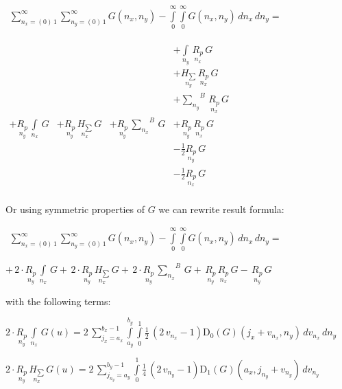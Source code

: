 \documentclass[11pt]{article}
\begin{document}
    \(\begin{array}{r} \sum\limits_{n_x=\left(0\right)\,1}^{\infty} \sum\limits_{n_y=\left(0\right)\,1}^{\infty} G\left(n_x, n_y\right) - \int\limits_{0}^{\infty} \int\limits_{0}^{\infty} G\left(n_x, n_y\right)\,d{n_x}\,d{n_y} = \end{array}\)

    \(\begin{array}{llll}  \,&  \,&  \,&  + \int\limits_{n_y}^{}\,\underset{n_x}{R_{p}}\,G \\  \,&  \,&  \,&  + \underset{n_y}{H_{\sum}}\,\underset{n_x}{R_{p}}\,G \\  \,&  \,&  \,&  + {\sum\limits_{n_y}^{}}^{B}\,\underset{n_x}{R_{p}}\,G \\  + \underset{n_y}{R_{p}}\,\int\limits_{n_x}^{}\,G &  + \underset{n_y}{R_{p}}\,\underset{n_x}{H_{\sum}}\,G &  + \underset{n_y}{R_{p}}\,{\sum\limits_{n_x}^{}}^{B}\,G &  + \underset{n_y}{R_{p}}\,\underset{n_x}{R_{p}}\,G \\  \,&  \,&  \,&  - \frac{1}{2}\underset{n_y}{R_{p}}\,G \\  \,&  \,&  \,&  - \frac{1}{2}\underset{n_x}{R_{p}}\,G \\ \end{array}\)

    Or using symmetric properties of \(G\) we can rewrite result formula:

    \(\begin{array}{r} \sum\limits_{n_x=\left(0\right)\,1}^{\infty} \sum\limits_{n_y=\left(0\right)\,1}^{\infty} G\left(n_x, n_y\right) - \int\limits_{0}^{\infty} \int\limits_{0}^{\infty} G\left(n_x, n_y\right)\,d{n_x}\,d{n_y} = \end{array}\)

    \(+\,2\cdot\underset{n_y}{R_{p}}\,\int\limits_{n_x}^{}\,G +\,2\cdot\underset{n_y}{R_{p}}\,\underset{n_x}{H_{\sum}}\,G +\,2\cdot\underset{n_y}{R_{p}}\,{\sum\limits_{n_x}^{}}^{B}\,G +\,\underset{n_y}{R_{p}}\,\underset{n_x}{R_{p}}\,G -\,\underset{n_y}{R_{p}}\,G\)

    with the following terms:

\(2\cdot\underset{n_y}{R_{p}}\,\int\limits_{n_x}^{}\,G\left(u\right) = 2 \, {\sum\limits_{j_{x}=a_{x}}^{b_{x} - 1} \int\limits_{a_{y}}^{b_{y}} \int\limits_{0}^{1} \frac{1}{2} \, {\left(2 \, v_{n_{x}} - 1\right)} \mathrm{D}_{0}\left(G\right)\left(j_{x} + v_{n_{x}}, n_{y}\right)\,{d v_{n_{x}}}\,{d n_{y}}}\)

\(2\cdot\underset{n_y}{R_{p}}\,\underset{n_x}{H_{\sum}}\,G\left(u\right) = 2 \, {\sum\limits_{j_{n_{y}}=a_{y}}^{b_{y} - 1} \int\limits_{0}^{1} \frac{1}{4} \, {\left(2 \, v_{n_{y}} - 1\right)} \mathrm{D}_{1}\left(G\right)\left(a_{x}, j_{n_{y}} + v_{n_{y}}\right)\,{d v_{n_{y}}}}\)
\end{document}
